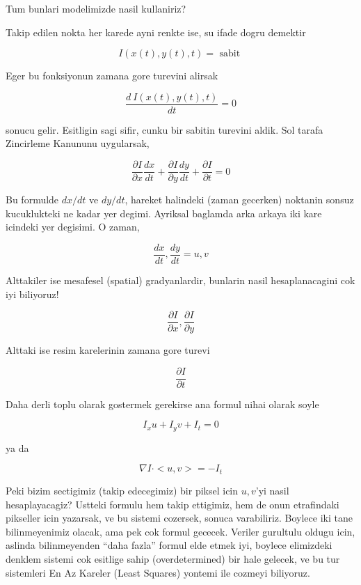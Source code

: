 \documentclass[12pt,fleqn]{article}
\begin{document}
Tum bunlari modelimizde nasil kullaniriz? 

Takip edilen nokta her karede ayni renkte ise, su ifade dogru demektir 

\[ I(x(t),y(t),t) = \textrm{ sabit } \]

Eger bu fonksiyonun zamana gore turevini alirsak

\[ \frac{d \ I(x(t),y(t),t)}{dt} = 0\]

sonucu gelir. Esitligin sagi sifir, cunku bir sabitin turevini aldik. Sol
tarafa Zincirleme Kanununu uygularsak, 

\[ \frac{\partial I}{\partial x}\frac{dx}{dt} +
\frac{\partial I}{\partial y}\frac{dy}{dt} +
\frac{\partial I}{\partial t} = 0
\]

Bu formulde $dx/dt$ ve $dy/dt$, hareket halindeki (zaman gecerken) noktanin
sonsuz kucuklukteki ne kadar yer degimi. Ayriksal baglamda arka arkaya iki
kare icindeki yer degisimi. O zaman,

\[ \frac{dx}{dt}, \frac{dy}{dt} = u, v \]

Alttakiler ise mesafesel (spatial) gradyanlardir, bunlarin nasil
hesaplanacagini cok iyi biliyoruz! 

\[ 
\frac{\partial I}{\partial x}, \frac{\partial I}{\partial y}
 \]

Alttaki ise resim karelerinin zamana gore turevi

\[ 
\frac{\partial I}{\partial t}
 \]

Daha derli toplu olarak gostermek gerekirse ana formul nihai olarak soyle

\[ I_x u + I_y v + I_t = 0 \]

ya da

\[ 
\nabla I \cdot <u, v> = -I_t
 \]

Peki bizim sectigimiz (takip edecegimiz) bir piksel icin $u,v$'yi nasil
hesaplayacagiz? Ustteki formulu hem takip ettigimiz, hem de onun
etrafindaki pikseller icin yazarsak, ve bu sistemi cozersek, sonuca
varabiliriz. Boylece iki tane bilinmeyenimiz olacak, ama pek cok formul
gececek. Veriler gurultulu oldugu icin, aslinda bilinmeyenden ``daha
fazla'' formul elde etmek iyi, boylece elimizdeki denklem sistemi cok
esitlige sahip (overdetermined) bir hale gelecek, ve bu tur sistemleri En
Az Kareler (Least Squares) yontemi ile cozmeyi biliyoruz.









\end{document}
